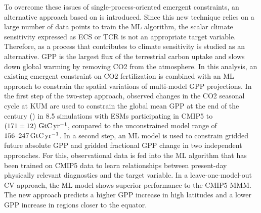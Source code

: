 To overcome these issues of single-process-oriented emergent constraints, an
alternative approach based on  is introduced. Since this new
technique relies on a large number of data points to train the \acs{ML}
algorithm, the scalar climate sensitivity expressed as \acs{ECS} or \acs{TCR}
is not an appropriate target variable. Therefore,  as a
process that contributes to climate sensitivity is studied as an alternative.
\acs{GPP} is the largest flux of the terrestrial carbon uptake and slows down
global warming by removing \acs{CO2} from the atmosphere. In this analysis, an
existing emergent constraint on \acs{CO2} fertilization is combined with an
\acs{ML} approach to constrain the spatial variations of multi-model \acs{GPP}
projections. In the first step of the two-step approach, observed changes in
the \acs{CO2} seasonal cycle at \acl{KUM} are used to constrain the global mean
\acs{GPP} at the end of the  century () in
 8.5 simulations with \acsp{ESM} participating in \acs{CMIP}5
to $\pmrangeunit{171}{12}{\GtCyr{}}$, compared to the unconstrained model range
of $\rangeunit{156}{247}{\GtCyr{}}$. In a second step, an \acs{ML} model is
used to constrain gridded future absolute \acs{GPP} and gridded fractional
\acs{GPP} change in two independent approaches. For this, observational data is
fed into the \acs{ML} algorithm that has been trained on \acs{CMIP}5 data to
learn relationships between present-day physically relevant diagnostics and the
target variable. In a leave-one-model-out \acl{CV} approach, the \acs{ML} model
shows superior performance to the \acs{CMIP}5 \acs{MMM}. The new approach
predicts a higher \acs{GPP} increase in high latitudes and a lower \acs{GPP}
increase in regions closer to the equator.
